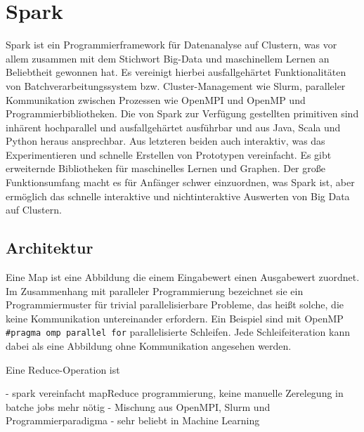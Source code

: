 \chapter{Spark}
\label{sct:spark}

Spark ist ein Programmierframework für Datenanalyse auf Clustern, was vor allem zusammen mit dem Stichwort Big-Data und maschinellem Lernen an Beliebtheit gewonnen hat. Es vereinigt hierbei ausfallgehärtet Funktionalitäten von Batchverarbeitungssystem bzw. Cluster-Management wie Slurm, paralleler Kommunikation zwischen Prozessen wie OpenMPI und OpenMP und Programmierbibliotheken. Die von Spark zur Verfügung gestellten primitiven sind inhärent hochparallel und ausfallgehärtet ausführbar und aus Java, Scala und Python heraus ansprechbar. Aus letzteren beiden auch interaktiv, was das Experimentieren und schnelle Erstellen von Prototypen vereinfacht. Es gibt erweiternde Bibliotheken für maschinelles Lernen und Graphen. Der große Funktionsumfang macht es für Anfänger schwer einzuordnen, was Spark ist, aber ermöglich das schnelle interaktive und nichtinteraktive Auswerten von Big Data auf Clustern.



\section{Architektur}

Eine Map ist eine Abbildung die einem Eingabewert einen Ausgabewert zuordnet. Im Zusammenhang mit paralleler Programmierung bezeichnet sie ein Programmiermuster für trivial parallelisierbare Probleme, das heißt solche, die keine Kommunikation untereinander erfordern. Ein Beispiel sind mit OpenMP  \lstinline!#pragma omp parallel for! parallelisierte Schleifen. Jede Schleifeiteration kann dabei als eine Abbildung ohne Kommunikation angesehen werden.

Eine Reduce-Operation ist

 - spark vereinfacht mapReduce programmierung, keine manuelle Zerelegung in batche jobs mehr nötig
 - Mischung aus OpenMPI, Slurm und Programmierparadigma
 - sehr beliebt in Machine Learning

